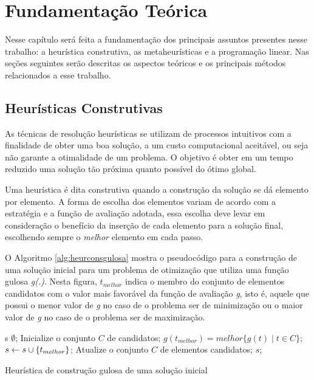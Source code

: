 \chapter{Fundamentação Teórica}

  Nesse capítulo será feita a fundamentação dos principais assuntos presentes nesse trabalho: a heurística construtiva, as metaheurísticas e a programação linear. Nas seções seguintes serão descritas os aspectos teóricos e os principais métodos relacionados a esse trabalho.

	\section{Heurísticas Construtivas}
		As técnicas de resolução heurísticas se utilizam de processos intuitivos com a finalidade de obter uma boa solução, a um custo computacional aceitável, ou seja não garante a otimalidade de um problema. O objetivo é obter em um tempo reduzido uma solução tão próxima quanto possível do ótimo global. 
		
		Uma heurística é dita construtiva quando a construção da solução se dá elemento por elemento. A forma de escolha dos elementos variam de acordo com a estratégia e a função de avaliação adotada, essa escolha deve levar em consideração o benefício da inserção de cada elemento para a solução final, escolhendo sempre o \emph{melhor} elemento em cada passo.
		
		O Algoritmo \ref{alg:heurconsgulosa} mostra o pseudocódigo para a construção de uma solução inicial para um problema de otimização que utiliza uma função gulosa \emph{g(.)}. Nesta figura, \emph{$t_{melhor}$} indica o membro do conjunto de elementos candidatos com o valor mais favorável da função de avaliação \emph{g}, isto é, aquele que possui o menor valor de \emph{g} no caso de o problema ser de minimização ou o maior valor de \emph{g} no caso de o problema ser de maximização.


\begin{pgrm}[h]
\begin{programma}
\STATE s \GETS $\emptyset$;
\STATE Inicialize o conjunto $C$ de candidatos;
\STATE $g(t_{melhor}) = melhor\{g(t) \mid t \in C\}$;
\STATE $s \leftarrow s \cup \{t_{melhor}\}$;
\STATE Atualize o conjunto $C$ de elementos candidatos;
\ENDWHILE
\STATE\RETURN $s$;
\ENDALGORITHM
\end{programma}
\caption{Heurística de construção gulosa de uma solução inicial}\label{alg:heurconsgulosa}

\end{pgrm}		
		

